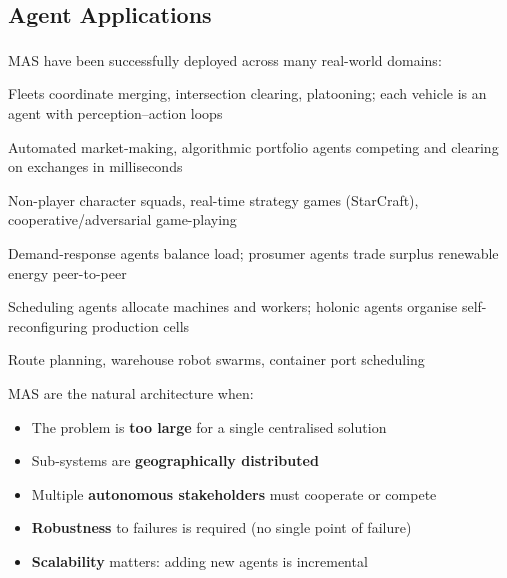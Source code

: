\subsection{Agent Applications}
\begin{tcbitemize}[ skin=sectionraster ]

    \tcbitem[title=Application Domains, raster multicolumn=4]
    MAS have been successfully deployed across many real-world
    domains:\textsuperscript{\cite[][p.~6]{weissMultiagentSystems2013}}
    \begin{description}[leftmargin=0.6cm, labelindent=0pt]
        \item[\textbf{Autonomous vehicles}] Fleets coordinate merging, intersection clearing,
              platooning; each vehicle is an agent with perception--action loops
        \item[\textbf{Electronic trading}] Automated market-making, algorithmic portfolio agents
              competing and clearing on exchanges in milliseconds
        \item[\textbf{Game AI}] Non-player character squads, real-time strategy games (StarCraft),
              cooperative/adversarial game-playing
        \item[\textbf{Smart grid}] Demand-response agents balance load; prosumer agents trade
              surplus renewable energy peer-to-peer
        \item[\textbf{Manufacturing}] Scheduling agents allocate machines and workers; holonic
              agents organise self-reconfiguring production cells
        \item[\textbf{Logistics}] Route planning, warehouse robot swarms, container port scheduling
    \end{description}

    \tcbitem[title=Why MAS?, raster multicolumn=2]
    MAS are the natural architecture when:
    \begin{itemize}
        \item The problem is \textbf{too large} for a single centralised solution
        \item Sub-systems are \textbf{geographically distributed}
        \item Multiple \textbf{autonomous stakeholders} must cooperate or compete
        \item \textbf{Robustness} to failures is required (no single point of failure)
        \item \textbf{Scalability} matters: adding new agents is incremental
    \end{itemize}
    \textsuperscript{\cite[][p.~3]{wooldridgeIntroductionMultiAgentSystems2009}}

\end{tcbitemize}

